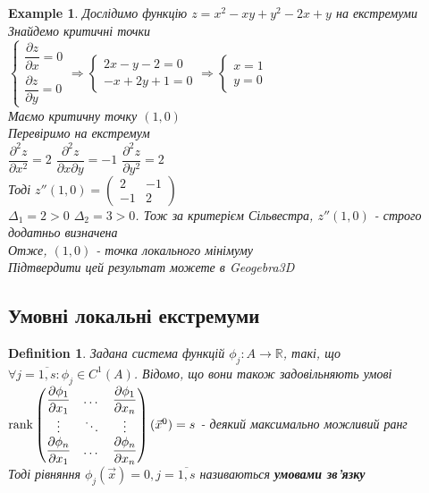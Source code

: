 \documentclass[a4paper, 14pt]{extarticle}
\theoremstyle{theoremdd}
\theoremstyle{theoremdd}
\newtheorem{definition}[theorem]{Definition}
\theoremstyle{theoremdd}
\theoremstyle{theoremdd}
\newtheorem{example}[theorem]{Example}
\theoremstyle{theoremdd}
\theoremstyle{theoremdd}
\theoremstyle{theoremdd}
\theoremstyle{theoremdd}
\def\departial#1#2{\dfrac{\partial {#1}}{\partial {#2}}}
\begin{document}
\begin{example}
Дослідимо функцію $z = x^2 - xy + y^2 - 2x + y$ на екстремуми\\
Знайдемо критичні точки\\
$\begin{cases}
\departial{z}{x} = 0 \\
\departial{z}{y} = 0 
\end{cases} \Rightarrow
\begin{cases}
2x - y - 2 = 0 \\
-x +2y +1 = 0 
\end{cases} \Rightarrow
\begin{cases}
x = 1 \\
y = 0
\end{cases}
$\\
Маємо критичну точку $(1,0)$\\
Перевіримо на екстремум\\
$\dfrac{\partial^2 z}{\partial x^2} = 2$ \hspace{1cm} $\dfrac{\partial^2 z}{\partial x \partial y} = -1$ \hspace{1cm} $\dfrac{\partial^2 z}{\partial y^2} = 2$\\
Тоді $z''(1,0) = \begin{pmatrix}
2 & -1 \\
-1 & 2
\end{pmatrix}$\\
$\Delta_1 = 2 > 0$ \hspace{1cm} $\Delta_2 = 3 > 0$. Тож за критерієм Сільвестра, $z''(1,0)$ - строго додатньо визначена\\
Отже, $(1,0)$ - точка локального мінімуму\\
Підтвердити цей результат можете в Geogebra3D
\end{example}

\subsection{Умовні локальні екстремуми}
\begin{definition}
Задана система функцій $\phi_j: A \to \mathbb{R}$, такі, що $\forall j=\overline{1,s}: \phi_j \in C^1(A)$. Відомо, що вони також задовільняють умові\\
$\rank \begin{pmatrix}
\departial{\phi_1}{x_1} & \dots & \departial{\phi_1}{x_n} \\
\vdots & \ddots & \vdots \\
\departial{\phi_n}{x_1} & \dots & \departial{\phi_n}{x_n}
\end{pmatrix}(\vec{x}^0) = s$ - деякий максимально можливий ранг\\
Тоді рівняння $\phi_j(\vec{x}) = 0, j=\overline{1,s}$ називаються \textbf{умовами зв'язку}
\end{definition}
\end{document}
